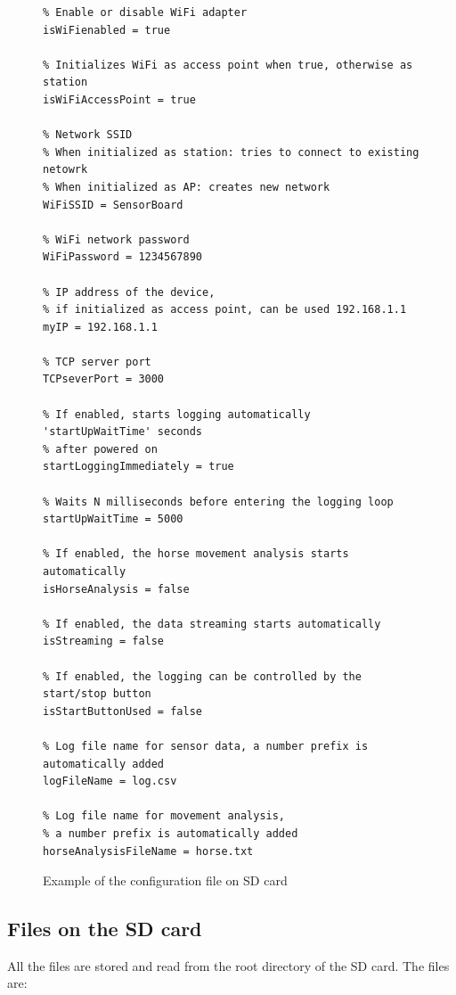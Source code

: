 \begin{figure}
	\centering
	\label{SBconfigFile}
	\caption{Example of the configuration file on SD card}
	\begin{verbatim}
% Enable or disable WiFi adapter
isWiFienabled = true

% Initializes WiFi as access point when true, otherwise as station
isWiFiAccessPoint = true

% Network SSID
% When initialized as station: tries to connect to existing netowrk
% When initialized as AP: creates new network
WiFiSSID = SensorBoard

% WiFi network password
WiFiPassword = 1234567890

% IP address of the device,
% if initialized as access point, can be used 192.168.1.1
myIP = 192.168.1.1

% TCP server port
TCPseverPort = 3000

% If enabled, starts logging automatically 'startUpWaitTime' seconds
% after powered on
startLoggingImmediately = true

% Waits N milliseconds before entering the logging loop
startUpWaitTime = 5000

% If enabled, the horse movement analysis starts automatically
isHorseAnalysis = false

% If enabled, the data streaming starts automatically
isStreaming = false

% If enabled, the logging can be controlled by the start/stop button
isStartButtonUsed = false

% Log file name for sensor data, a number prefix is automatically added
logFileName = log.csv

% Log file name for movement analysis,
% a number prefix is automatically added
horseAnalysisFileName = horse.txt
	\end{verbatim}
\end{figure}

\subsection{Files on the SD card}
All the files are stored and read from the root directory of the SD card. The files are:


